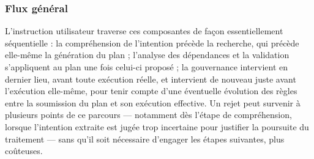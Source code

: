 \subsubsection{Flux général}

L'instruction utilisateur traverse ces composantes de façon essentiellement séquentielle : la compréhension de l'intention précède la recherche, qui précède elle-même la génération du plan ; l'analyse des dépendances et la validation s'appliquent au plan une fois celui-ci proposé ; la gouvernance intervient en dernier lieu, avant toute exécution réelle, et intervient de nouveau juste avant l'exécution elle-même, pour tenir compte d'une éventuelle évolution des règles entre la soumission du plan et son exécution effective. Un rejet peut survenir à plusieurs points de ce parcours — notamment dès l'étape de compréhension, lorsque l'intention extraite est jugée trop incertaine pour justifier la poursuite du traitement — sans qu'il soit nécessaire d'engager les étapes suivantes, plus coûteuses.


